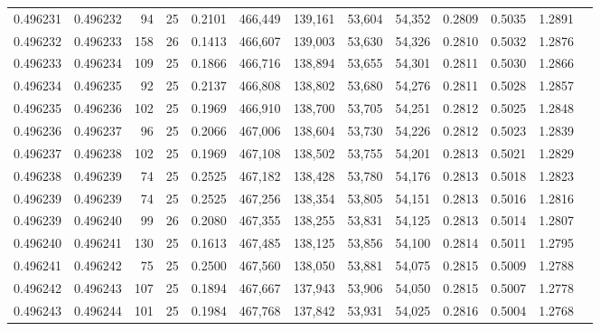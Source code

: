 \begin{tabular}{rrrrrrrrrrrrr}
0.496231 & 0.496232 &    94 &  25 &                                     0.2101 & 466,449 & 139,161 &  53,604 &  54,352 & 0.2809 & 0.5035 & 1.2891 \\
0.496232 & 0.496233 &   158 &  26 &                                     0.1413 & 466,607 & 139,003 &  53,630 &  54,326 & 0.2810 & 0.5032 & 1.2876 \\
0.496233 & 0.496234 &   109 &  25 &                                     0.1866 & 466,716 & 138,894 &  53,655 &  54,301 & 0.2811 & 0.5030 & 1.2866 \\
0.496234 & 0.496235 &    92 &  25 &                                     0.2137 & 466,808 & 138,802 &  53,680 &  54,276 & 0.2811 & 0.5028 & 1.2857 \\
0.496235 & 0.496236 &   102 &  25 &                                     0.1969 & 466,910 & 138,700 &  53,705 &  54,251 & 0.2812 & 0.5025 & 1.2848 \\
0.496236 & 0.496237 &    96 &  25 &                                     0.2066 & 467,006 & 138,604 &  53,730 &  54,226 & 0.2812 & 0.5023 & 1.2839 \\
0.496237 & 0.496238 &   102 &  25 &                                     0.1969 & 467,108 & 138,502 &  53,755 &  54,201 & 0.2813 & 0.5021 & 1.2829 \\
0.496238 & 0.496239 &    74 &  25 &                                     0.2525 & 467,182 & 138,428 &  53,780 &  54,176 & 0.2813 & 0.5018 & 1.2823 \\
0.496239 & 0.496239 &    74 &  25 &                                     0.2525 & 467,256 & 138,354 &  53,805 &  54,151 & 0.2813 & 0.5016 & 1.2816 \\
0.496239 & 0.496240 &    99 &  26 &                                     0.2080 & 467,355 & 138,255 &  53,831 &  54,125 & 0.2813 & 0.5014 & 1.2807 \\
0.496240 & 0.496241 &   130 &  25 &                                     0.1613 & 467,485 & 138,125 &  53,856 &  54,100 & 0.2814 & 0.5011 & 1.2795 \\
0.496241 & 0.496242 &    75 &  25 &                                     0.2500 & 467,560 & 138,050 &  53,881 &  54,075 & 0.2815 & 0.5009 & 1.2788 \\
0.496242 & 0.496243 &   107 &  25 &                                     0.1894 & 467,667 & 137,943 &  53,906 &  54,050 & 0.2815 & 0.5007 & 1.2778 \\
0.496243 & 0.496244 &   101 &  25 &                                     0.1984 & 467,768 & 137,842 &  53,931 &  54,025 & 0.2816 & 0.5004 & 1.2768 \\

\end{tabular}
